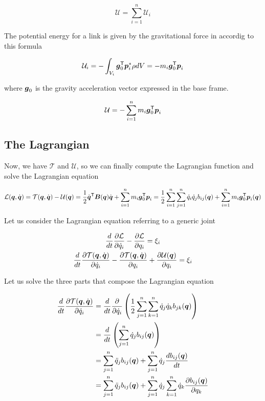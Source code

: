 \[
	\mathcal{U} = \sum_{i=1}^n \mathcal{U}_i
\]

The potential energy for a link is given by the gravitational force in accordig to this formula

\[
	\mathcal{U}_i = - \int_{V_i} \boldsymbol{g}_0^{\mathsf{T}} \boldsymbol{p}_i^* \rho dV =
	- m_i \boldsymbol{g}_0^{\mathsf{T}} \boldsymbol{p}_i
\]

where $\boldsymbol{g}_0$ is the gravity acceleration vector expressed in the base frame.

\[
	\mathcal{U} = - \sum_{i=1}^n m_i \boldsymbol{g}_0^{\mathsf{T}} \boldsymbol{p}_i
\]

\subsection{The Lagrangian}

Now, we have $\mathcal{T}$ and $\mathcal{U}$, so we can finally compute the Lagrangian function and solve the Lagrangian equation

\[
	\mathcal{L}(\boldsymbol{q},\dot{\boldsymbol{q}}) = \mathcal{T}(\boldsymbol{q},\dot{\boldsymbol{q}}) - \mathcal{U}(\boldsymbol{q}) =
	\frac{1}{2} \dot{\boldsymbol{q}}^{\mathsf{T}} \boldsymbol{B}(\boldsymbol{q}) \dot{\boldsymbol{q}} + \sum_{i=1}^n m_i \boldsymbol{g}_0^{\mathsf{T}} \boldsymbol{p}_i =
	\frac{1}{2} \sum_{i=1}^n \sum_{j=1}^n \dot{q}_i \dot{q}_j b_{ij}(\boldsymbol{q}) + \sum_{i=1}^n m_i \boldsymbol{g}_0^{\mathsf{T}} \boldsymbol{p}_i(\boldsymbol{q})
\]

Let us consider the Lagrangian equation referring to a generic joint

\begin{gather}
    \frac{d}{dt}\frac{\partial \mathcal{L}}{\partial \dot{q}_i} - \frac{\partial \mathcal{L}}{\partial q_i} = \xi_i  \nonumber \\
    \frac{d}{dt}\frac{\partial \mathcal{T}(\boldsymbol{q},\dot{\boldsymbol{q}})}{\partial \dot{q}_i} -
    \frac{\partial \mathcal{T}(\boldsymbol{q},\dot{\boldsymbol{q}})}{\partial q_i} +
    \frac{\partial \mathcal{U}(\boldsymbol{q})}{\partial q_i} = \xi_i \label{eq:lagrange-kinetics-potential}
\end{gather}

Let us solve the three parts that compose the Lagrangian equation

\begin{align*}
    \frac{d}{dt}\frac{\partial \mathcal{T}(\boldsymbol{q},\dot{\boldsymbol{q}})}{\partial \dot{q}_i}
    &= \frac{d}{dt}\frac{\partial}{\partial \dot{q}_i} \left( \frac{1}{2} \sum_{j=1}^n \sum_{k=1}^n \dot{q}_j \dot{q}_k b_{jk}(\boldsymbol{q}) \right) \\
    &= \frac{d}{dt} \left( \sum_{j=1}^n \dot{q}_j b_{ij}(\boldsymbol{q}) \right) \\
    &= \sum_{j=1}^n \ddot{q}_j b_{ij}(\boldsymbol{q}) + \sum_{j=1}^n \dot{q}_j \frac{d b_{ij}(\boldsymbol{q})}{dt} \\
	&= \sum_{j=1}^n \ddot{q}_j b_{ij}(\boldsymbol{q}) + \sum_{j=1}^n \dot{q}_j \sum_{k=1}^n \dot{q}_k \frac{\partial b_{ij}(\boldsymbol{q})}{\partial q_k}
\end{align*}

